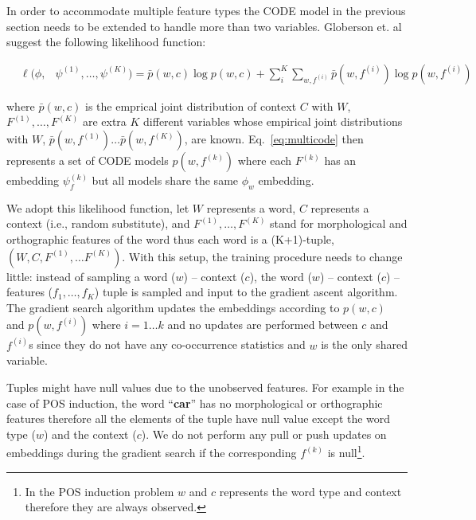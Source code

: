 
In order to accommodate multiple feature types the CODE model in the
previous section needs to be extended to handle more than two
variables.  Globerson et. al suggest
the following likelihood function:

\begin{eqnarray}
&\ell(\phi,& \psi^{(1)}, \ldots, \psi^{(K)}) = \label{eq:multicode}
  \bar{p}(w,c) \log p(w,c) + \sum_i^K \sum_{w,f^{(i)}} \bar{p}(w,f^{(i)}) \log p(w,f^{(i)})
\end{eqnarray}

\noindent where $\bar{p}(w,c)$ is the emprical joint distribution 
of context $C$ with $W$, $F^{(1)}, \ldots, F^{(K)}$ are extra $K$
different variables whose empirical joint distributions with $W$,
$\bar{p}(w,f^{(1)})\ldots\bar{p}(w,f^{(K)})$, are known.
Eq.~\ref{eq:multicode} then represents a set of CODE models
$p(w,f^{(k)})$ where each $F^{(k)}$ has an embedding $\psi_f^{(k)}$
but all models share the same $\phi_w$ embedding.

We adopt this likelihood function, let $W$ represents a word, $C$
represents a context (i.e., random substitute), and $F^{(1)}, \ldots,
F^{(K)}$ stand for morphological and orthographic features of the word
thus each word is a (K+1)-tuple, $(W, C, F^{(1)}, \hdots F^{(K)})$.
With this setup, the training procedure needs to change little:
instead of sampling a word ($w$) -- context ($c$), the word ($w$) --
context ($c$) -- features ($f_1,\hdots,f_K$) tuple is sampled and
input to the gradient ascent algorithm.  The gradient search algorithm
updates the embeddings according to $p(w,c)$ and $p(w,f^{(i)})$ where
$i=1\hdots k$ and no updates are performed between $c$ and $f^{(i)}$s
since they do not have any co-occurrence statistics and $w$ is the
only shared variable.

Tuples might have null values due to the unobserved features.  For
example in the case of POS induction, the word ``\textbf{car}'' has no
morphological or orthographic features therefore all the elements of
the tuple have null value except the word type ($w$) and the context
($c$).  We do not perform any pull or push updates on embeddings
during the gradient search if the corresponding $f^{(k)}$ is
null\footnote{In the POS induction problem $w$ and $c$ represents the
word type and context therefore they are always observed.}.

